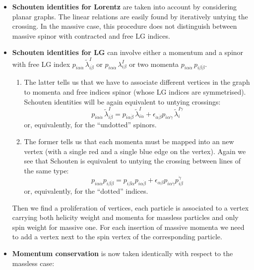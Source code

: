 \documentclass[aps,prd,nofootinbib,twocolumn,10pt]{revtex4-2}
\begin{document}
\begin{itemize}
	\item \textbf{Schouten identities for Lorentz} are taken into account by considering planar graphs. The linear relations are easily found by iteratively untying the crossing. In the massive case, this procedure does not distinguish between massive spinor with contracted and free LG indices.
	\item \textbf{Schouten identities for LG} can involve either a momentum and a spinor with free LG index $p_{i \alpha \dot{\alpha}}\, \widetilde{\lambda}^I_{i \dot{\beta}}$ or $p_{i \alpha \dot{\alpha}}\, \lambda^I_{i \beta}$ or two momenta $p_{i \alpha \dot{\alpha}}\, p_{i \beta \dot{\beta}}$.
	\begin{enumerate}
		\item The latter tells us that we have to associate different vertices in the graph to momenta and free indices spinor (whose LG indices are symmetrised). Schouten identities will be again equivalent to untying crossings:
		\begin{equation}
			p_{i \alpha \dot{\alpha}}\, \widetilde{\lambda}^I_{i \dot{\beta}} = p_{i \alpha \dot{\beta}}\, \widetilde{\lambda}^I_{i \dot{\alpha}} + \epsilon_{\dot{\alpha} \dot{\beta}} p_{i \alpha \dot{\gamma}}\, \widetilde{\lambda}^{I \dot{\gamma}}_{i}
		\end{equation}
		or, equivalently, for the “undotted” spinors.
		\item The former tells us that each momenta must be mapped into an new vertex (with a single red and a single blue edge on the vertex). Again we see that Schouten is equivalent to untying the crossing between lines of the same type:
		\begin{equation}
			p_{i \alpha \dot{\alpha}} p_{i \beta \dot{\beta}} = p_{i \beta \dot{\alpha}} p_{i \alpha \dot{\beta}} + \epsilon_{\alpha \beta} p_{i \alpha \dot{\gamma}} p_{i \beta}^{\dot{\gamma}}
		\end{equation}
		or, equivalently, for the “dotted” indices.
	\end{enumerate}
	Then we ﬁnd a proliferation of vertices, each particle is associated to a vertex carrying both helicity weight and momenta for massless particles and only spin weight for massive one. For each insertion of massive momenta we need to add a vertex next to the spin vertex of the corresponding particle.
	\item \textbf{Momentum conservation} is now taken identically with respect to the massless case:
	\begin{align}

\end{align}
\end{itemize}
\end{document}
